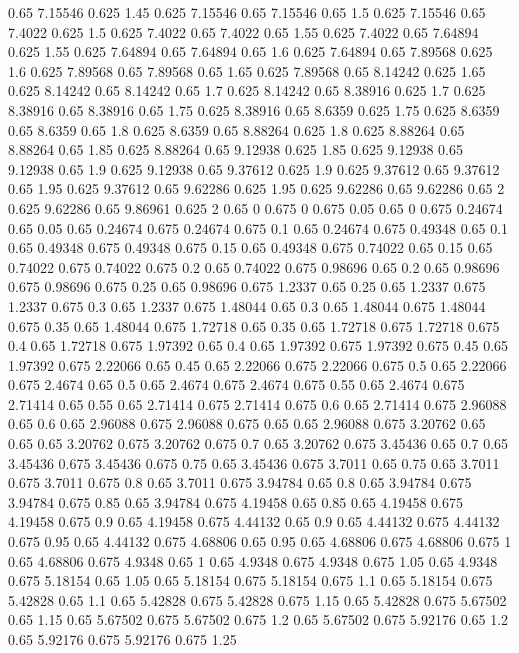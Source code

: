 0.65 7.15546
0.625 1.45
0.625 7.15546
0.65 7.15546
0.65 1.5
0.625 7.15546
0.65 7.4022
0.625 1.5
0.625 7.4022
0.65 7.4022
0.65 1.55
0.625 7.4022
0.65 7.64894
0.625 1.55
0.625 7.64894
0.65 7.64894
0.65 1.6
0.625 7.64894
0.65 7.89568
0.625 1.6
0.625 7.89568
0.65 7.89568
0.65 1.65
0.625 7.89568
0.65 8.14242
0.625 1.65
0.625 8.14242
0.65 8.14242
0.65 1.7
0.625 8.14242
0.65 8.38916
0.625 1.7
0.625 8.38916
0.65 8.38916
0.65 1.75
0.625 8.38916
0.65 8.6359
0.625 1.75
0.625 8.6359
0.65 8.6359
0.65 1.8
0.625 8.6359
0.65 8.88264
0.625 1.8
0.625 8.88264
0.65 8.88264
0.65 1.85
0.625 8.88264
0.65 9.12938
0.625 1.85
0.625 9.12938
0.65 9.12938
0.65 1.9
0.625 9.12938
0.65 9.37612
0.625 1.9
0.625 9.37612
0.65 9.37612
0.65 1.95
0.625 9.37612
0.65 9.62286
0.625 1.95
0.625 9.62286
0.65 9.62286
0.65 2
0.625 9.62286
0.65 9.86961
0.625 2
0.65 0
0.675 0
0.675 0.05
0.65 0
0.675 0.24674
0.65 0.05
0.65 0.24674
0.675 0.24674
0.675 0.1
0.65 0.24674
0.675 0.49348
0.65 0.1
0.65 0.49348
0.675 0.49348
0.675 0.15
0.65 0.49348
0.675 0.74022
0.65 0.15
0.65 0.74022
0.675 0.74022
0.675 0.2
0.65 0.74022
0.675 0.98696
0.65 0.2
0.65 0.98696
0.675 0.98696
0.675 0.25
0.65 0.98696
0.675 1.2337
0.65 0.25
0.65 1.2337
0.675 1.2337
0.675 0.3
0.65 1.2337
0.675 1.48044
0.65 0.3
0.65 1.48044
0.675 1.48044
0.675 0.35
0.65 1.48044
0.675 1.72718
0.65 0.35
0.65 1.72718
0.675 1.72718
0.675 0.4
0.65 1.72718
0.675 1.97392
0.65 0.4
0.65 1.97392
0.675 1.97392
0.675 0.45
0.65 1.97392
0.675 2.22066
0.65 0.45
0.65 2.22066
0.675 2.22066
0.675 0.5
0.65 2.22066
0.675 2.4674
0.65 0.5
0.65 2.4674
0.675 2.4674
0.675 0.55
0.65 2.4674
0.675 2.71414
0.65 0.55
0.65 2.71414
0.675 2.71414
0.675 0.6
0.65 2.71414
0.675 2.96088
0.65 0.6
0.65 2.96088
0.675 2.96088
0.675 0.65
0.65 2.96088
0.675 3.20762
0.65 0.65
0.65 3.20762
0.675 3.20762
0.675 0.7
0.65 3.20762
0.675 3.45436
0.65 0.7
0.65 3.45436
0.675 3.45436
0.675 0.75
0.65 3.45436
0.675 3.7011
0.65 0.75
0.65 3.7011
0.675 3.7011
0.675 0.8
0.65 3.7011
0.675 3.94784
0.65 0.8
0.65 3.94784
0.675 3.94784
0.675 0.85
0.65 3.94784
0.675 4.19458
0.65 0.85
0.65 4.19458
0.675 4.19458
0.675 0.9
0.65 4.19458
0.675 4.44132
0.65 0.9
0.65 4.44132
0.675 4.44132
0.675 0.95
0.65 4.44132
0.675 4.68806
0.65 0.95
0.65 4.68806
0.675 4.68806
0.675 1
0.65 4.68806
0.675 4.9348
0.65 1
0.65 4.9348
0.675 4.9348
0.675 1.05
0.65 4.9348
0.675 5.18154
0.65 1.05
0.65 5.18154
0.675 5.18154
0.675 1.1
0.65 5.18154
0.675 5.42828
0.65 1.1
0.65 5.42828
0.675 5.42828
0.675 1.15
0.65 5.42828
0.675 5.67502
0.65 1.15
0.65 5.67502
0.675 5.67502
0.675 1.2
0.65 5.67502
0.675 5.92176
0.65 1.2
0.65 5.92176
0.675 5.92176
0.675 1.25
